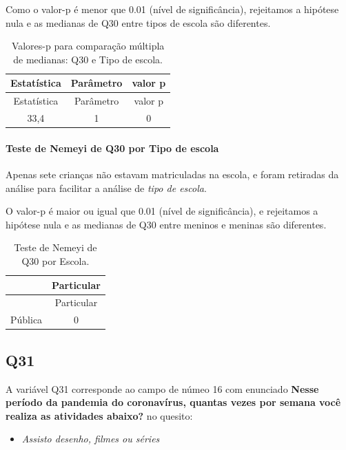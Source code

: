 \documentclass[]{article}
\providecommand{\tightlist}{%
  \setlength{\itemsep}{0pt}\setlength{\parskip}{0pt}}
\let\oldparagraph\paragraph
\renewcommand{\paragraph}[1]{\oldparagraph{#1}\mbox{}}
\begin{document}
Como o valor-p é menor que 0.01 (nível de significância), rejeitamos a hipótese nula e as medianas de Q30 entre tipos de escola são diferentes.

\begin{longtable}[]{@{}ccc@{}}
\caption{\label{tab:unnamed-chunk-1003}Valores-p para comparação múltipla de medianas: Q30 e Tipo de escola.}\tabularnewline
\toprule
Estatística & Parâmetro & valor p\tabularnewline
\midrule
\endfirsthead
\toprule
Estatística & Parâmetro & valor p\tabularnewline
\midrule
\endhead
33,4 & 1 & 0\tabularnewline
\bottomrule
\end{longtable}

\hypertarget{teste-de-nemeyi-de-q30-por-tipo-de-escola}{%
\paragraph{Teste de Nemeyi de Q30 por Tipo de escola}\label{teste-de-nemeyi-de-q30-por-tipo-de-escola}}

Apenas sete crianças não estavam matriculadas na escola, e foram retiradas da análise para facilitar a análise de \emph{tipo de escola}.

O valor-p é maior ou igual que 0.01 (nível de significância), e rejeitamos a hipótese nula e as medianas de Q30 entre meninos e meninas são diferentes.

\begin{longtable}[]{@{}lc@{}}
\caption{\label{tab:unnamed-chunk-1005}Teste de Nemeyi de Q30 por Escola.}\tabularnewline
\toprule
& Particular\tabularnewline
\midrule
\endfirsthead
\toprule
& Particular\tabularnewline
\midrule
\endhead
Pública & 0\tabularnewline
\bottomrule
\end{longtable}

\cleardoublepage

\hypertarget{q31}{%
\subsection{Q31}\label{q31}}

A variável Q31 corresponde ao campo de númeo 16 com enunciado \textbf{Nesse período da pandemia do coronavírus, quantas vezes por semana você realiza as atividades abaixo?} no quesito:

\begin{itemize}
\tightlist
\item
  \emph{Assisto desenho, filmes ou séries}
\end{itemize}
\end{document}
